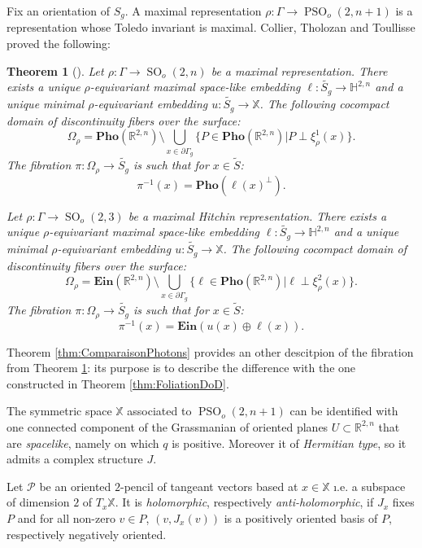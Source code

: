 \documentclass[reqno,10pt]{amsart}
\theoremstyle{plain}
\newtheorem{thm}{Theorem}[section]
\theoremstyle{definition}
\theoremstyle{remark}
\newcommand{\R}{\mathbb{R}}
\DeclareMathOperator{\PSO}{PSO}
\DeclareMathOperator{\SO}{SO}
\newcommand{\Ein}{\mathbf{Ein}}
\newcommand{\Pho}{\mathbf{Pho}}
\newcommand{\X}{\mathbb{X}}
\newcommand{\ie}{namely }
\begin{document}
Fix an orientation of $S_g$. A maximal representation $\rho:\Gamma\to \PSO_o(2,n+1)$ is a representation whose Toledo invariant is maximal. Collier, Tholozan and Toullisse proved the following:

\begin{thm}[\cite{Collier_2019}]
\label{thm:CollierTholozanToulisse}
Let $\rho:\Gamma\to \SO_o(2,n)$ be a maximal representation. There exists a unique  $\rho$-equivariant maximal space-like embedding $\ell:\widetilde{S_g}\to \mathbb{H}^{2,n}$ and a unique minimal $\rho$-equivariant embedding $u:\widetilde{S_g}\to \X$. 
The following cocompact domain of discontinuity  fibers over the surface:
$$\Omega_\rho= \Pho(\R^{2,n})\setminus \bigcup_{x\in \partial \Gamma_g}\lbrace P\in  \Pho(\R^{2,n})|P\perp \xi^1_\rho(x)\rbrace.$$ 
The fibration $\pi:\Omega_\rho\to \widetilde{S_g}$ is such that for $x\in \widetilde{S}$: 
$$\pi^{-1}(x)=\Pho(\ell(x)^\perp).$$

\medskip

Let $\rho:\Gamma\to \SO_o(2,3)$ be a maximal Hitchin representation. There exists a unique  $\rho$-equivariant maximal space-like embedding $\ell:\widetilde{S_g}\to \mathbb{H}^{2,n}$ and a unique minimal $\rho$-equivariant embedding $u:\widetilde{S_g}\to \X$. 
The following cocompact domain of discontinuity  fibers over the surface:
$$\Omega_\rho= \Ein(\R^{2,n})\setminus\bigcup_{x\in \partial \Gamma_g}\lbrace \ell\in  \Pho(\R^{2,n})|\ell\perp \xi^2_\rho(x)\rbrace.$$ 
The fibration $\pi:\Omega_\rho\to \widetilde{S_g}$ is such that for $x\in \widetilde{S}$:
$$\pi^{-1}(x)=\Ein(u(x)\oplus \ell(x)).$$
\end{thm}

Theorem \ref{thm:ComparaisonPhotons} provides an other descitpion of the fibration from Theorem \ref{thm:CollierTholozanToulisse}: its purpose is to describe the difference with the one constructed in Theorem \ref{thm:FoliationDoD}.

\medskip

 The symmetric space $\X$ associated to $\PSO_o(2,n+1)$ can be identified with one connected component of the Grassmanian of oriented planes $U\subset \R^{2,n}$ that are \emph{spacelike}, \ie on which $q$ is positive. Moreover it of \emph{Hermitian type}, so it admits a complex structure $J$. 
 
 Let $\mathcal{P}$ be an oriented $2$-pencil of tangeant vectors based at $x\in \X$ \i.e. a subspace of dimension $2$ of $T_x\X$. It is  \emph{holomorphic}, respectively \emph{anti-holomorphic}, if $J_x$ fixes $P$ and for all non-zero $v\in P$, $\left(v,J_x(v)\right)$ is a positively oriented basis of $P$, respectively negatively oriented. 
\end{document}
